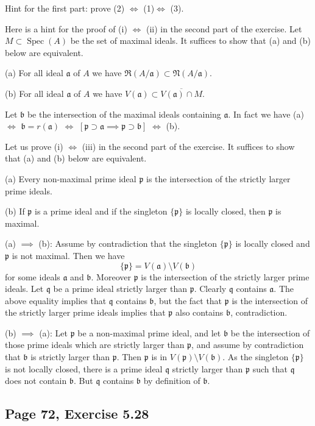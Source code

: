 \documentclass[parskip=half,fontsize=12pt]{scrartcl}%
\newcommand{\mf}{\mathfrak}
\newcommand{\aaa}{\mf a}
\newcommand{\bbb}{\mf b}
\newcommand{\ppp}{\mf p}
\newcommand{\qqq}{\mf q}
\newcommand{\Spec}{\operatorname{Spec}}\newcommand{\Sp}{\operatorname{Spec}}
\begin{document}
Hint for the first part: prove (2) $\iff$ (1)$\iff$ (3).

Here is a hint for the proof of (i) $\iff$ (ii) in the second part of the exercise. Let $M\subset\Spec(A)$ be the set of maximal ideals. It suffices to show that (a) and (b) below are equivalent.

(a) For all ideal $\aaa$ of $A$ we have $\mf R(A/\aaa)\subset\mf N(A/\aaa)$.

(b) For all ideal $\aaa$ of $A$ we have $V(\aaa)\subset\overline{V(\aaa)\cap M}$.

Let $\bbb$ be the intersection of the maximal ideals containing $\aaa$. In fact we have (a) $\iff$ $\bbb=r(\aaa)$ $\iff$ $[\ppp\supset\aaa\implies\ppp\supset\bbb]$ $\iff$ (b).

Let us prove (i) $\iff$ (iii) in the second part of the exercise. It suffices to show that (a) and (b) below are equivalent.

(a) Every non-maximal prime ideal $\ppp$ is the intersection of the strictly larger prime ideals.

(b) If $\ppp$ is a prime ideal and if the singleton $\{\ppp\}$ is locally closed, then $\ppp$ is maximal.

(a) $\implies$ (b): Assume by contradiction that the singleton $\{\ppp\}$ is locally closed and $\ppp$ is not maximal. Then we have 
$$
\{\ppp\}=V(\aaa)\setminus V(\bbb)
$$ 
for some ideals $\aaa$ and $\bbb$. Moreover $\ppp$ is the intersection of the strictly larger prime ideals. Let $\qqq$ be a prime ideal strictly larger than $\ppp$. Clearly $\qqq$ contains $\aaa$. The above equality implies that $\qqq$ contains $\bbb$, but the fact that $\ppp$ is the intersection of the strictly larger prime ideals implies that $\ppp$ also contains $\bbb$, contradiction.

(b) $\implies$ (a): Let $\ppp$ be a non-maximal prime ideal, and let $\bbb$ be the intersection of those prime ideals which are strictly larger than $\ppp$, and assume by contradiction that $\bbb$ is strictly larger than $\ppp$. Then $\ppp$ is in $V(\ppp)\setminus V(\bbb)$. As the singleton $\{\ppp\}$ is not locally closed, there is a prime ideal $\qqq$ strictly larger than $\ppp$ such that $\qqq$ does not contain $\bbb$. But $\qqq$ contains $\bbb$ by definition of $\bbb$.

\subsection{Page 72, Exercise 5.28}%
\end{document}
